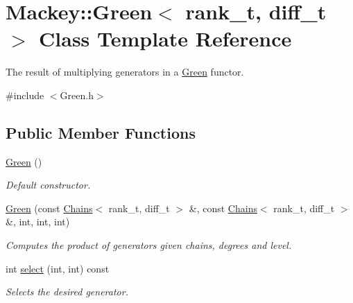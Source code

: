 \hypertarget{classMackey_1_1Green}{}\section{Mackey\+:\+:Green$<$ rank\+\_\+t, diff\+\_\+t $>$ Class Template Reference}
\label{classMackey_1_1Green}


The result of multiplying generators in a \hyperlink{classMackey_1_1Green}{Green} functor.  




{\ttfamily \#include $<$Green.\+h$>$}

\subsection*{Public Member Functions}
\begin{DoxyCompactItemize}
\item 
\hyperlink{classMackey_1_1Green_ad3bb0ba97c91a5db4fcf57687a571915}{Green} ()
\begin{DoxyCompactList}\small\item\em Default constructor. \end{DoxyCompactList}\item 
\hyperlink{classMackey_1_1Green_a614ae228cc8c5cccddcf562923f06f3a}{Green} (const \hyperlink{classMackey_1_1Chains}{Chains}$<$ rank\+\_\+t, diff\+\_\+t $>$ \&, const \hyperlink{classMackey_1_1Chains}{Chains}$<$ rank\+\_\+t, diff\+\_\+t $>$ \&, int, int, int)
\begin{DoxyCompactList}\small\item\em Computes the product of generators given chains, degrees and level. \end{DoxyCompactList}\item 
int \hyperlink{classMackey_1_1Green_a094a394ff8e1f4801fb3a5f09e071def}{select} (int, int) const
\begin{DoxyCompactList}\small\item\em Selects the desired generator. \end{DoxyCompactList}\end{DoxyCompactItemize}
